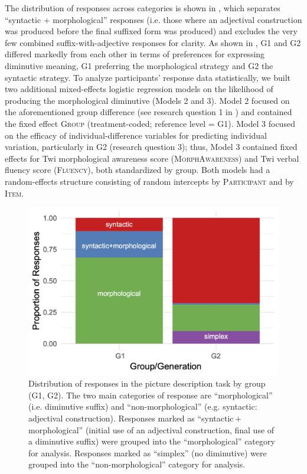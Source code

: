 \documentclass[output=paper,colorlinks,citecolor=brown]{langscibook}
\begin{document}
The distribution of responses across categories is shown in , which separates “syntactic + morphological” responses (i.e. those where an adjectival construction was produced before the final suffixed form was produced) and excludes the very few combined suffix-with-adjective responses for clarity. As shown in , G1 and G2 differed markedly from each other in terms of preferences for expressing diminutive meaning, G1 preferring the morphological strategy and G2 the syntactic strategy. To analyze participants' response data statistically, we built two additional mixed-effects logistic regression models on the likelihood of producing the morphological diminutive (Models 2 and 3). Model 2 focused on the aforementioned group difference (see research question 1 in ) and contained the fixed effect \textsc{Group} (treatment-coded; reference level = G1). Model 3 focused on the efficacy of individual-difference variables for predicting individual variation, particularly in G2 (research question 3); thus, Model 3 contained fixed effects for Twi morphological awareness score (\textsc{MorphAwareness}) and Twi verbal fluency score (\textsc{Fluency}), both standardized by group. Both models had a random-effects structure consisting of random intercepts by \textsc{Participant} and by \textsc{Item}.\largerpage

\begin{figure}
\includegraphics[width=.75\textwidth]{figures/Fig2.png}
\caption{Distribution of responses in the picture description task by group (G1, G2). The two main categories of response are “morphological” (i.e. diminutive suffix) and “non-morphological” (e.g. syntactic: adjectival construction). Responses marked as “syntactic\,+\,morphological” (initial use of an adjectival construction, final use of a diminutive suffix) were grouped into the “morphological” category for analysis. Responses marked as “simplex” (no diminutive) were grouped into the “non-morphological” category for analysis.}
\label{fig:PDT}
\end{figure}
\end{document}
